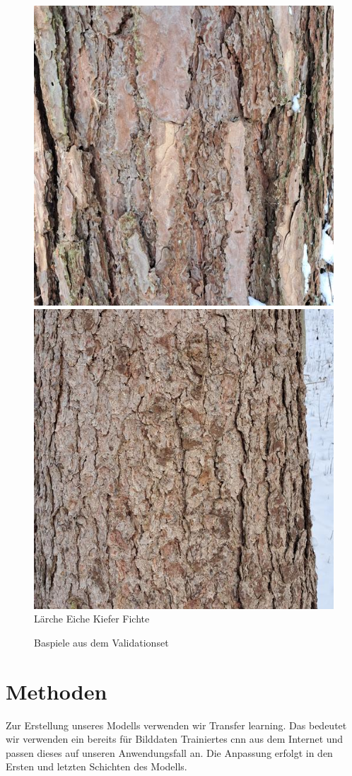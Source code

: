 \documentclass{article}
\begin{document}
\begin{figure}[h!]
  \includegraphics[width=0.24\linewidth]{examples/validation/Pine}
  \includegraphics[width=0.24\linewidth]{examples/validation/Spruce}
  Lärche \hspace{70pt} Eiche \hspace{70pt} Kiefer \hspace{70pt} Fichte\\
  \caption{Baspiele aus dem Validationset}
  \label{validation}
\end{figure}

\section{Methoden}

Zur Erstellung unseres Modells verwenden wir Transfer learning. Das bedeutet wir verwenden ein bereits für Bilddaten Trainiertes \ac{cnn} aus dem Internet und passen dieses auf unseren Anwendungsfall an. 
Die Anpassung erfolgt in den Ersten und letzten Schichten des Modells. 
\end{document}
